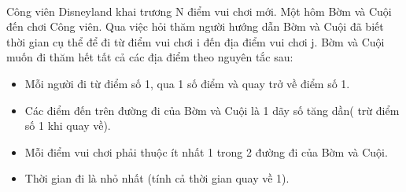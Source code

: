  

Công viên Disneyland khai trương N điểm vui chơi mới. Một hôm Bờm và Cuội đến chơi Công viên. Qua việc hỏi thăm người hướng dẫn Bờm và Cuội đã biết thời gian cụ thể để đi từ điểm vui chơi i đến địa điểm vui chơi j. Bờm và Cuội muốn đi thăm hết tất cả các địa điểm theo nguyên tắc sau:
\begin{itemize}
	\item Mỗi người đi từ điểm số 1, qua 1 số điểm và quay trở về điểm số 1.
	\item Các điểm đến trên đường đi của Bờm và Cuội là 1 dãy số tăng dần( trừ điểm số 1 khi quay về).
	\item Mỗi điểm vui chơi phải thuộc ít nhất 1 trong 2 đường đi của Bờm và Cuội.
	\item Thời gian đi là nhỏ nhất (tính cả thời gian quay về 1).
\end{itemize}

\